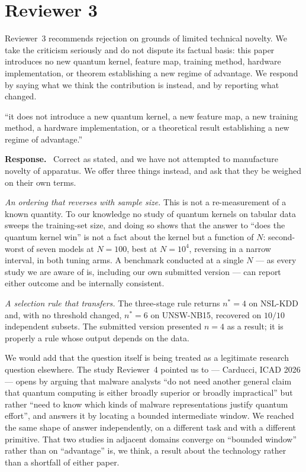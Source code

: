 \documentclass[11pt,a4paper]{article}
\newenvironment{revcomment}
  {\par\addvspace{6pt}\begingroup
   \color{quotegray}\itshape\small
   \begin{list}{}{%
     \setlength{\leftmargin}{1.8em}\setlength{\rightmargin}{1.0em}%
     \setlength{\topsep}{0pt}\setlength{\partopsep}{0pt}%
     \setlength{\parsep}{3pt}\setlength{\itemsep}{0pt}}%
   \item[]}
  {\end{list}\endgroup\normalcolor\addvspace{6pt}}
\newcommand{\itemhead}[2]{%
  \par\addvspace{15pt}%
  \noindent{\bfseries\color{tagink}#1}\hspace{0.7em}{\bfseries #2}%
  \par\addvspace{3.5pt}%
  \noindent{\color{rulegray}\rule{\linewidth}{0.5pt}}%
  \par\addvspace{5pt}%
  \nobreak}
\newcommand{\resp}{\par\addvspace{2pt}\noindent\textbf{Response.}\ }
\begin{document}
\section{Reviewer 3}

Reviewer~3 recommends rejection on grounds of limited technical novelty. We take
the criticism seriously and do not dispute its factual basis: this paper
introduces no new quantum kernel, feature map, training method, hardware
implementation, or theorem establishing a new regime of advantage. We respond by
saying what we think the contribution is instead, and by reporting what changed.

\itemhead{R3-1}{The model is a standard ZZFeatureMap configuration; technical
novelty is limited}
\begin{revcomment}
``it does not introduce a new quantum kernel, a new feature map, a new training
method, a hardware implementation, or a theoretical result establishing a new
regime of advantage.''
\end{revcomment}
\resp
Correct as stated, and we have not attempted to manufacture novelty of apparatus.
We offer three things instead, and ask that they be weighed on their own terms.

\emph{An ordering that reverses with sample size.} This is not a re-measurement
of a known quantity. To our knowledge no study of quantum kernels on tabular
data sweeps the training-set size, and doing so shows that the answer to
``does the quantum kernel win'' is not a fact about the kernel but a function of
$N$: second-worst of seven models at $N=100$, best at $N=10^{4}$, reversing in a
narrow interval, in both tuning arms. A benchmark conducted at a single $N$ ---
as every study we are aware of is, including our own submitted version --- can
report either outcome and be internally consistent.

\emph{A selection rule that transfers.} The three-stage rule returns
$n^{\ast}=4$ on NSL-KDD and, with no threshold changed, $n^{\ast}=6$ on
UNSW-NB15, recovered on $10/10$ independent subsets. The submitted version
presented $n=4$ as a result; it is properly a rule whose output depends on the
data.

We would add that the question itself is being treated as a legitimate research
question elsewhere. The study Reviewer~4 pointed us to --- Carducci, ICAD 2026
--- opens by arguing that malware analysts ``do not need another general claim
that quantum computing is either broadly superior or broadly impractical'' but
rather ``need to know which kinds of malware representations justify quantum
effort'', and answers it by locating a bounded intermediate window. We reached the same shape of answer independently, on a
different task and with a different primitive. That two studies in adjacent
domains converge on ``bounded window'' rather than on ``advantage'' is, we
think, a result about the technology rather than a shortfall of either paper.
\end{document}
